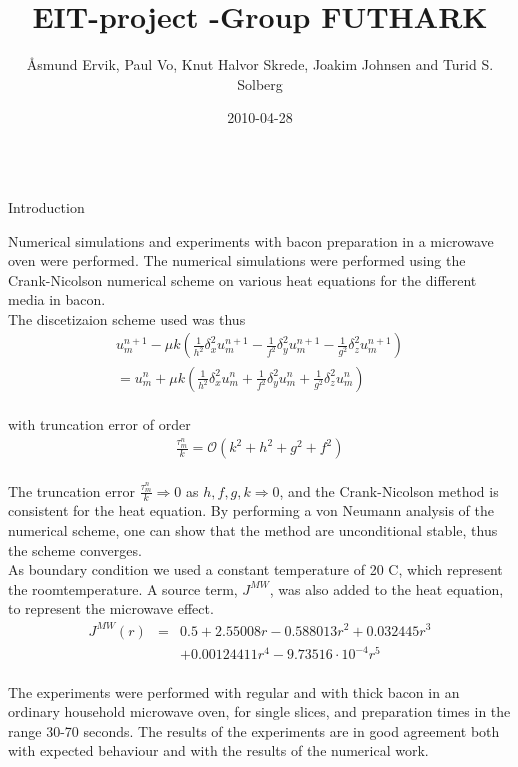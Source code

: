 \documentclass[final,hyperref={pdfpagelabels=false}]{beamer}
\title[NTNU-poster]{EIT-project -Group FUTHARK}
\author[Ervik et al.]{\AA smund Ervik, Paul Vo, Knut Halvor Skrede, Joakim Johnsen and Turid S. Solberg}
\institute[mia, NTNU]{MiA: Mathematics in Applications, Experts in Teamwork (Spring 2011), NTNU}
\date{2010-04-28}
\begin{document}
  \begin{frame}{}
  \begin{columns}[t]
  \begin{column}{.97\textwidth}

	\justifying

    \begin{multicols}{2}
	{\Large Introduction}

	Numerical simulations and experiments with bacon preparation
	in a microwave oven were performed. The numerical simulations were
	performed using the Crank-Nicolson numerical scheme on various heat
	equations for the different media in bacon. 
\\
The discetizaion scheme used was thus
\\
\begin{eqnarray*}
u_m^{n+1}-\mu k(\frac{1}{h^2}\delta_x^2 u_m^{n+1}-\frac{1}{f^2}\delta_y^2 u_m^{n+1}-\frac{1}{g^2}\delta_z^2 u_m^{n+1}) \\
=u_m^n + \mu k(\frac{1}{h^2}\delta_x^2 u_m^n + \frac{1}{f^2}\delta_y^2 u_m^n +\frac{1}{g^2}\delta_z^2 u_m^n)
\label{crank}
\end{eqnarray*}
\\
with truncation error of order
\begin{eqnarray*}
\frac{\tau_m^ n}{k} = \mathcal{O} (k^2 + h^2 + g^2 + f^2)
\label{truncerror}
\end{eqnarray*}
\\
The truncation error $\frac{\tau_m^n}{k} \Rightarrow 0$ as $h,f,g,k \Rightarrow 0$, and the Crank-Nicolson method is consistent for the heat equation. By performing a von Neumann analysis of the numerical scheme, one can show that the method are unconditional stable, thus the scheme converges.
\\
As boundary condition we used a constant temperature of 20 \textdegree C, which represent the roomtemperature. A source term, $J^{MW}$, was also added to the heat equation, to represent the microwave effect.
\\
\begin{eqnarray*}
  J^{MW}(r) &=& 0.5 + 2.55008r - 0.588013r^2 + 0.032445r^3 \\
    && + 0.00124411r^4 - 9.73516\cdot 10^{-4}r^5
  \label{eq:effektfordeling}
\end{eqnarray*}
\\
The experiments were
	performed with regular and with thick bacon in an ordinary household
	microwave oven, for single slices, and preparation times in the range
	30-70 seconds. The results of the experiments are in good agreement both
	with expected behaviour and with the results of the numerical work.
	

\end{multicols}
\end{column}
\end{columns}
\end{frame}
\end{document}
